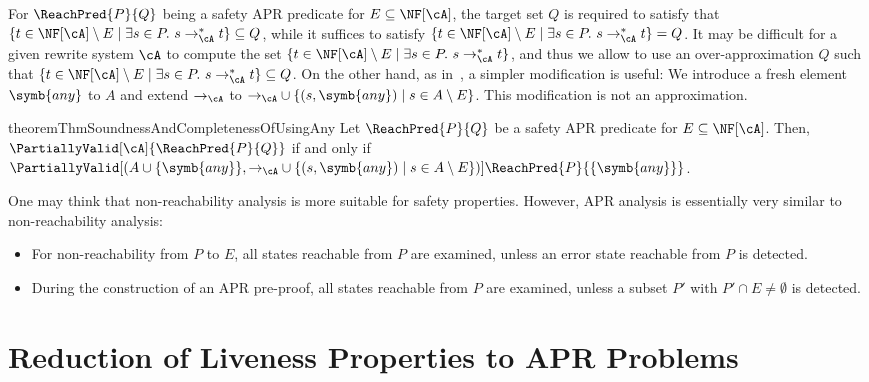 For $\ReachPred{P}{Q}$ being a safety APR predicate for $E \subseteq \NF[\cA]$,
the target set $Q$ is required to satisfy that
$\{ t \in \NF[\cA] \setminus E \mid \exists s \in P.\ s \to_\cA^* t \} \subseteq Q$,
while it suffices to satisfy $\{ t \in \NF[\cA] \setminus E \mid \exists s \in P.\ s \to_\cA^* t \} = Q$.
It may be difficult for a given rewrite system $\cA$ to compute the set $\{ t \in \NF[\cA] \setminus E \mid \exists s \in P.\ s \to_\cA^* t \}$, and thus we allow to use an over-approximation $Q$ such that $\{ t \in \NF[\cA] \setminus E \mid \exists s \in P.\ s \to_\cA^* t \} \subseteq Q$.
On the other hand, as in~\cite{KN23jlamp}, a simpler modification is useful:
We introduce a fresh element $\symb{any}$ to $A$ and extend $\to_\cA$ to ${\to_\cA} \cup \{ (s,\symb{any}) \mid s \in A \setminus E \}$.
This modification is not an approximation.

\begin{restatable}{theorem}{ThmSoundnessAndCompletenessOfUsingAny}
	\label{thm:soundness-and-completeness-of-using-any}
	Let $\ReachPred{P}{Q}$ be a safety APR predicate for $E \subseteq \NF[\cA]$.
	Then,
	$\PartiallyValid[\cA]{\ReachPred{P}{Q}}$ if and only if
	$\PartiallyValid[(A\cup\{\symb{any}\}, {\to_\cA}\cup\{ (s,\symb{any}) \mid s \in A \setminus E \})]{\ReachPred{P}{\{\symb{any}\}}}$.
\end{restatable}



One may think that non-reachability analysis is more suitable for safety properties.
However, APR analysis is essentially very similar to non-reachability analysis:
\begin{itemize}
	\item For non-reachability from $P$ to $E$, all states reachable from $P$ are examined, unless an error state reachable from $P$ is detected.
	\item During the construction of an APR pre-proof, all states reachable from $P$ are examined, unless a subset $P'$ with $P'\cap E \ne \emptyset$ is detected.
\end{itemize}


\section{Reduction of Liveness Properties to APR Problems}
\label{sec:reduction-of-liveness}



